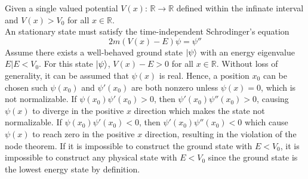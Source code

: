 \begin{sol}
	Given a single valued potential $V(x)$: $\mathbb{R}\to\mathbb{R}$ defined within the infinate interval and $V(x)>V_0$ for all $x \in\mathbb{R}$. \\
	An stationary state must satisfy the time-independent Schrodinger's equation
	$$2m(V(x)-E)\psi=\psi''$$
	Assume there exists a well-behaved ground state $\ket\psi$ with an energy eigenvalue $E|E<V_0$. For this state $\ket\psi$, $V(x)-E>0$ for all $x \in\mathbb{R}$. Without loss of generality, it can be assumed that $\psi(x)$ is real. Hence, a position $x_0$ can be chosen such $\psi(x_0)$ and $\psi'(x_0)$ are both nonzero unless $\psi(x)=0$, which is not normalizable. If $\psi(x_0)\psi'(x_0)>0$, then $\psi'(x_0)\psi''(x_0)>0$, causing $\psi(x)$ to diverge in the positive $x$ direction which makes the state not normalizable. If $\psi(x_0)\psi'(x_0)<0$, then $\psi'(x_0)\psi''(x_0)<0$ which cause $\psi(x)$ to reach zero in the positive $x$ direction, resulting in the violation of the node theorem. If it is impossible to construct the ground state with $E<V_0$, it is impossible to construct any physical state with $E<V_0$ since the ground state is the lowest energy state by definition. 
\end{sol}